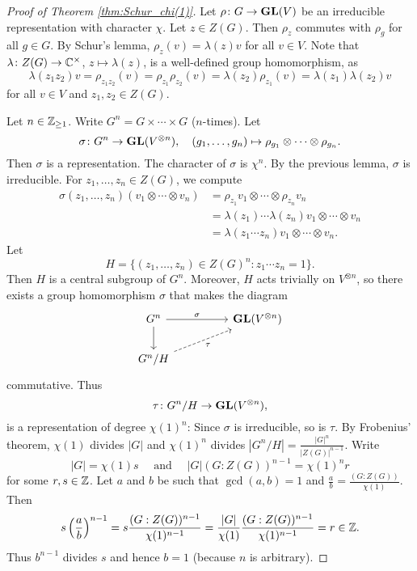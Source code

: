 \begin{proof}[Proof of Theorem \ref{thm:Schur_chi(1)}]
    Let $\rho\colon G\to\mathbf{GL}(V)$ be an irreducible representation 
    with character $\chi$. Let $z\in Z(G)$. Then $\rho_z$ commutes
    with $\rho_g$ for all $g\in G$. By Schur's lemma, 
    $\rho_z(v)=\lambda(z)v$ for all $v\in V$. Note that
    $\lambda\colon Z(G)\to\mathbb{C}^{\times}$, $z\mapsto\lambda(z)$, 
    is a well-defined group homomorphism, as 
    \[
    \lambda(z_1z_2)v=\rho_{z_1z_2}(v)=\rho_{z_1}\rho_{z_2}(v)
    =\lambda(z_2)\rho_{z_1}(v)=\lambda(z_1)\lambda(z_2)v
    \]
    for all $v\in V$ and $z_1,z_2\in Z(G)$. 
    
    Let $n\in\mathbb{Z}_{\geq1}$. Write $G^n=G\times\cdots\times G$ ($n$-times). Let
    \[
    \sigma\colon G^n\to\mathbf{GL}(V^{\otimes n}),\quad
    (g_1,\dots,g_n)\mapsto \rho_{g_1}\otimes\cdots\otimes\rho_{g_n}.
    \]
    Then $\sigma$ is a representation. 
    The character of $\sigma$ is $\chi^n$. By the previous lemma, 
    $\sigma$ is
    irreducible. For $z_1,\dots,z_n\in Z(G)$, we compute
    \begin{align*}   
    \sigma(z_1,\dots,z_n)(v_1\otimes\cdots\otimes v_n)&=\rho_{z_1}v_1\otimes\cdots\otimes \rho_{z_n}v_n\\
    &=\lambda(z_1)\cdots\lambda(z_n)v_1\otimes\cdots\otimes v_n\\
    &=\lambda(z_1\cdots z_n)v_1\otimes\cdots\otimes v_n.
    \end{align*}
    Let 
    \[
    H=\{(z_1,\dots,z_n)\in Z(G)^n:z_1\cdots z_n=1\}.
    \]  
    Then $H$ is a central subgroup of $G^n$. Moreover, 
    $H$ acts trivially on $V^{\otimes n}$, so there exists
    a group homomorphism $\sigma$ that makes the diagram 
    \[\begin{tikzcd}
	{G^n} && {\GL(V^{\otimes n})} \\
	{G^n/H}
	\arrow["\sigma", from=1-1, to=1-3]
	\arrow[from=1-1, to=2-1]
	\arrow["\tau"', dashed, from=2-1, to=1-3]
    \end{tikzcd}\]
    commutative. Thus  
    \[
    \tau\colon G^n/H\to\mathbf{GL}(V^{\otimes n}),
    \]
    is a representation 
    of degree $\chi(1)^n$:
    Since $\sigma$ is irreducible, so is $\tau$. 
    By Frobenius' theorem, $\chi(1)$ divides $|G|$ 
    and $\chi(1)^n$ divides $|G^n/H|=\frac{|G|^n}{|Z(G)|^{n-1}}$. 
    Write 
    \[
    |G|=\chi(1)s\quad\text{ and }\quad 
    |G|(G:Z(G))^{n-1}=\chi(1)^nr
    \]
    for some $r,s\in\mathbb{Z}$. Let $a$ and $b$ be such that 
    $\gcd(a,b)=1$ and 
    $\frac{a}{b}=\frac{(G:Z(G))}{\chi(1)}$. Then
    \[
    s\left(\frac{a}{b}\right)^{n-1}=s\frac{(G:Z(G))^{n-1}}{\chi(1)^{n-1}}
    =\frac{|G|}{\chi(1)}\frac{(G:Z(G))^{n-1}}{\chi(1)^{n-1}}=r\in\mathbb{Z}.
    \]
    Thus $b^{n-1}$ divides $s$ and hence $b=1$ (because $n$ is arbitrary).  
\end{proof}




